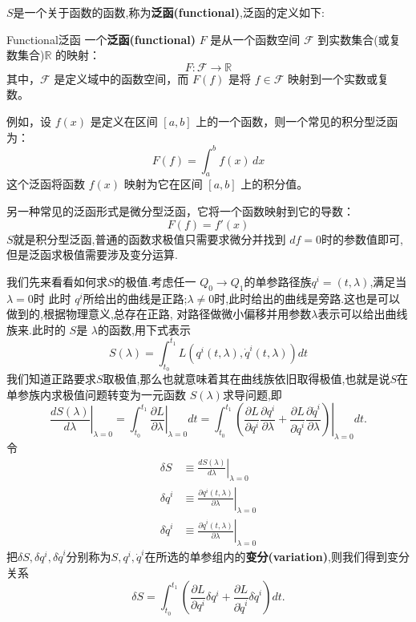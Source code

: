 \documentclass[../main.tex]{subfiles}
\begin{document}
 $S$是一个关于函数的函数,称为\textbf{泛函(functional)},泛函的定义如下:
 \begin{definition}
 {Functional}{泛函}
 一个\textbf{泛函(functional)} \( F \) 是从一个函数空间 \( \mathscr{F} \) 到实数集合(或复数集合)\( \mathbb{R} \) 的映射：
 \[
 F : \mathscr{F} \to \mathbb{R}
 \]
 其中，\( \mathscr{F} \) 是定义域中的函数空间，而 \( F(f) \) 是将 \( f \in \mathscr{F} \) 映射到一个实数或复数。
 \end{definition}
 \begin{note}
 例如，设 \( f(x) \) 是定义在区间 \( [a, b] \) 上的一个函数，则一个常见的积分型泛函为：
 \[
 F(f) = \int_a^b f(x) \, dx
 \]
 这个泛函将函数 \( f(x) \) 映射为它在区间 \( [a, b] \) 上的积分值。

 另一种常见的泛函形式是微分型泛函，它将一个函数映射到它的导数：
 \[
 F(f) = f'(x)
 \]
 $S$就是积分型泛函,普通的函数求极值只需要求微分并找到 $df = 0$时的参数值即可,但是泛函求极值需要涉及变分运算.
 \end{note}
 我们先来看看如何求$S$的极值.考虑任一 $Q_0\to Q_1$的单参路径族$q^i = (t, \lambda)$,满足当$\lambda = 0$时
 此时 $q^i$所给出的曲线是正路;$\lambda \neq 0$时,此时给出的曲线是旁路.这也是可以做到的,根据物理意义,总存在正路,
 对路径做微小偏移并用参数$\lambda$表示可以给出曲线族来.此时的 $S$是 $\lambda$的函数,用下式表示
 \begin{equation*}
 S(\lambda) = \int^{t_1}_{t_0}L(q^i(t,\lambda),\dot{q}^i(t,\lambda))dt 
 \end{equation*}
 我们知道正路要求$S$取极值,那么也就意味着其在曲线族依旧取得极值,也就是说$S$在单参族内求极值问题转变为一元函数 $S(\lambda)$求导问题,即
\[
  \left.\frac{d S(\lambda)}{d\lambda}\right|_{\lambda = 0} = \int^{t_1}_{t_0}\left.\frac{\partial L}{\partial \lambda}\right|_{\lambda = 0}dt 
      = \int^{t_1}_{t_0}\left.\left(\frac{\partial L}{\partial q^i}\frac{\partial q^i}{\partial \lambda}+ \frac{\partial L}{\partial \dot{q}^i} \frac{\partial \dot{q}^i}{\partial \lambda} \right)\right|_{\lambda = 0} dt
 .\] 
 令
 \begin{align*}
 \delta S &\equiv \left.\frac{dS(\lambda)}{d \lambda}\right|_{\lambda = 0}\\
   \delta q^i &\equiv \left.\frac{\partial q^i(t,\lambda)}{ \partial \lambda}\right|_{\lambda = 0}\\
     \delta  \dot{q}^i&\equiv \left.\frac{\partial\dot{q}^i(t,\lambda)}{ \partial \lambda  }\right|_{\lambda = 0} 
 \end{align*}
 把$\delta S, \delta q^i, \delta \dot{q}^i$分别称为$S, q^i, \dot{q}^i$在所选的单参组内的\textbf{变分(variation)},则我们得到变分关系 \[
 \delta S = \int^{t_1}_{t_0} \left( \frac{\partial L}{ \partial q^i}\delta q^i + \frac{\partial L}{\partial \dot{q}^i} \delta \dot{q}^i   \right)dt 
 .\] 
\end{document}
